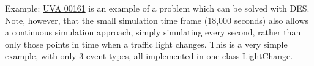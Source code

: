 Example: \href{http://uva.onlinejudge.org/index.php?option=com_onlinejudge&Itemid=8&category=3&page=show_problem&problem=97}{UVA 00161}
is an example of a problem which can be solved with DES.  Note, however, that the small simulation time
frame (18,000 seconds) also allows a continuous simulation approach, simply simulating every second,
rather than only those points in time when a traffic light changes.
This is a very simple example, with only 3 event types, all implemented in one
class LightChange.

\inputminted[fontsize=\footnotesize,linenos=true]{java}{code/UVA00161TrafficLights.java}

